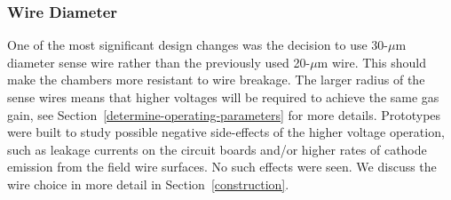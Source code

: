 \subsubsection{Wire Diameter}

One of the most significant design changes was the decision 
to use 30-$\mu$m diameter sense wire rather than the previously used 
20-$\mu$m wire. This should make the chambers more resistant to wire 
breakage.  The larger radius of the sense wires means that higher 
voltages will be required to achieve the same gas gain, see
Section~\ref{determine-operating-parameters} for more details.
Prototypes were built to study possible negative side-effects of the 
higher voltage operation, such as leakage currents on the circuit boards 
and/or higher rates of cathode emission from the field wire surfaces.
No such effects were seen.
We discuss the wire choice in more detail in Section~\ref{construction}.




 
